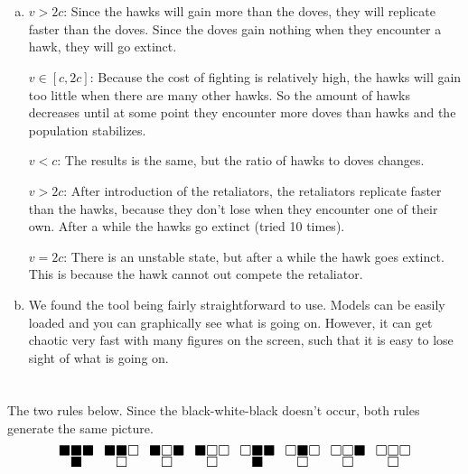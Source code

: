 \documentclass[11pt]{article}
\begin{document}
\section{}
\begin{enumerate}[(a)]
	\item $v>2c$: Since the hawks will gain more than the doves, they will replicate faster than the doves. Since the doves gain nothing when they encounter a hawk, they will go extinct.
	
	$v \in [c,2c]$: Because the cost of fighting is relatively high, the hawks will gain too little when there are many other hawks. So the amount of hawks decreases until at some point they encounter more doves than hawks and the population stabilizes.
	
	$v<c$: The results is the same, but the ratio of hawks to doves changes.
	
	$v>2c$: After introduction of the retaliators, the retaliators replicate faster than the hawks, because they don't lose when they encounter one of their own. After a while the hawks go extinct (tried 10 times).
	
	$v=2c$: There is an unstable state, but after a while the hawk goes extinct. This is because the hawk cannot out compete the retaliator.
	
	\item We found the tool being fairly straightforward to use. Models can be easily loaded and you can graphically see what is going on. However, it can get chaotic very fast with many figures on the screen, such that it is easy to lose sight of what is going on.
\end{enumerate}

\newpage

\section{}
The two rules below. Since the black-white-black doesn't occur, both rules generate the same picture. 
\[ \LARGE
\substack{\blacksquare \blacksquare \blacksquare \\ \blacksquare} \enspace
\substack{\blacksquare \blacksquare \square \\ \square} \enspace
\substack{\blacksquare \square \blacksquare \\ \square } \enspace
\substack{\blacksquare \square \square \\ \square} \enspace
\substack{\square \blacksquare \blacksquare \\ \blacksquare} \enspace
\substack{\square \blacksquare \square \\ \square} \enspace
\substack{\square \square \blacksquare \\ \square} \enspace
\substack{\square \square \square \\ \square}
\]
\end{document}
